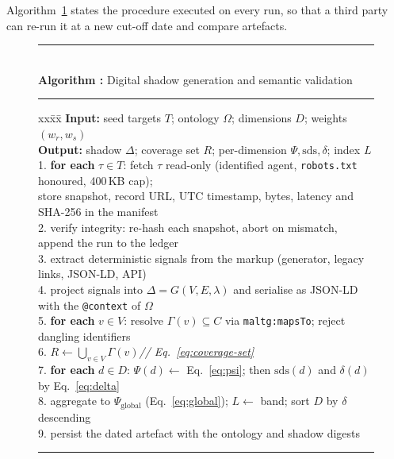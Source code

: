 \documentclass[engproc,proceedingpaper,submit,moreauthors]{Definitions/mdpi}
\newcounter{algo}
\renewcommand{\thealgo}{\arabic{algo}}
\begin{document}
Algorithm~\ref{alg:sds} states the procedure executed on every run, so that a third party can re-run it at a new cut-off date and compare artefacts.

\begin{figure}[H]
\centering
\begin{minipage}{\textwidth}
\small
{}\label{alg:sds}%
\rule{\textwidth}{0.6pt}\\[2pt]
\textbf{Algorithm \thealgo:} Digital shadow generation and semantic validation\\[-6pt]
\rule{\textwidth}{0.4pt}
\begin{tabbing}
xx\=xx\=\kill
\textbf{Input:} seed targets $T$; ontology $\Omega$; dimensions $D$; weights $(w_r,w_s)$\\
\textbf{Output:} shadow $\Delta$; coverage set $R$; per-dimension $\Psi,\mathrm{sds},\delta$; index $L$\\[2pt]
1.\> \textbf{for each} $\tau\in T$: fetch $\tau$ read-only (identified agent, \texttt{robots.txt} honoured, 400\,KB cap);\\
\> store snapshot, record URL, UTC timestamp, bytes, latency and SHA-256 in the manifest\\
2.\> verify integrity: re-hash each snapshot, abort on mismatch, append the run to the ledger\\
3.\> extract deterministic signals from the markup (generator, legacy links, JSON-LD, API)\\
4.\> project signals into $\Delta=G(V,E,\lambda)$ and serialise as JSON-LD with the \texttt{@context} of $\Omega$\\
5.\> \textbf{for each} $v\in V$: resolve $\Gamma(v)\subseteq C$ via \texttt{maltg:mapsTo}; reject dangling identifiers\\
6.\> $R \leftarrow \bigcup_{v\in V}\Gamma(v)$\hfill\textit{// Eq.~\eqref{eq:coverage-set}}\\
7.\> \textbf{for each} $d\in D$: $\Psi(d)\leftarrow$ Eq.~\eqref{eq:psi}; then $\mathrm{sds}(d)$ and $\delta(d)$ by Eq.~\eqref{eq:delta}\\
8.\> aggregate to $\Psi_{\mathrm{global}}$ (Eq.~\eqref{eq:global}); $L\leftarrow$ band; sort $D$ by $\delta$ descending\\
9.\> persist the dated artefact with the ontology and shadow digests
\end{tabbing}
\vspace{-6pt}\rule{\textwidth}{0.6pt}
\end{minipage}
\end{figure}
\end{document}
